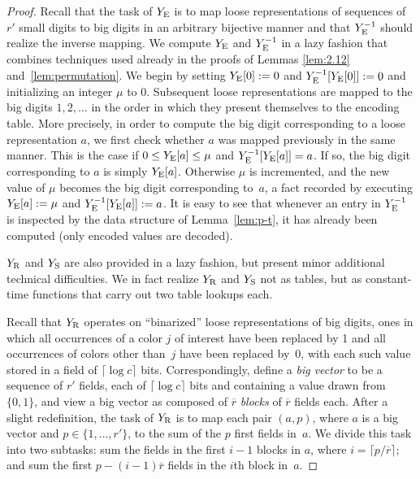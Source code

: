 \documentclass[envcountsame,envcountsect,undated,nolinenumbers]{lnthi}
\def\Tceil#1{\lceil #1\rceil}
\def\rbar{\overline{r}}
\begin{document}
\begin{proof}
Recall that
the task of $Y_{\mbox{\scriptsize E}}$ is to
map loose representations of sequences of
$r'$ small digits to big digits in an arbitrary
bijective manner and that $Y^{-1}_{\mbox{\scriptsize E}}$
should realize the inverse mapping.
We compute $Y_{\mbox{\scriptsize E}}$ and $Y^{-1}_{\mbox{\scriptsize E}}$
in a lazy fashion that combines techniques
used already in the proofs of
Lemmas \ref{lem:2.12} and~\ref{lem:permutation}.
We begin by setting $Y_{\mbox{\scriptsize E}}[0]:=0$
and $Y^{-1}_{\mbox{\scriptsize E}}[Y_{\mbox{\scriptsize E}}[0]]:=0$ and initializing
an integer $\mu$ to 0.
Subsequent loose representations are mapped to
the big digits $1,2,\ldots$ in the order in which
they present themselves to the encoding table.
More precisely, in order to compute
the big digit corresponding
to a loose representation $a$, we first check
whether $a$ was mapped previously in the same manner.
This is the case if $0\le Y_{\mbox{\scriptsize E}}[a]\le\mu$
and $Y^{-1}_{\mbox{\scriptsize E}}[Y_{\mbox{\scriptsize E}}[a]]=a$.
If so, the big digit corresponding to $a$
is simply $Y_{\mbox{\scriptsize E}}[a]$.
Otherwise $\mu$ is incremented, and the new
value of $\mu$ becomes the big digit corresponding
to~$a$, a fact recorded by executing
$Y_{\mbox{\scriptsize E}}[a]:=\mu$ and
$Y^{-1}_{\mbox{\scriptsize E}}[Y_{\mbox{\scriptsize E}}[a]]:=a$.
It is easy to see that whenever an entry in
$Y^{-1}_{\mbox{\scriptsize E}}$ is inspected by the data
structure of Lemma~\ref{lem:p-t}, it
has already been computed
(only encoded values are decoded).

$Y_{\mbox{\scriptsize R}}$ and $Y_{\mbox{\scriptsize S}}$ are also
provided in a lazy fashion, but present minor
additional technical difficulties.
We in fact realize $Y_{\mbox{\scriptsize R}}$ and $Y_{\mbox{\scriptsize S}}$
not as tables, but as constant-time functions
that carry out two table lookups each.

Recall that $Y_{\mbox{\scriptsize R}}$ operates on ``binarized'' loose
representations of big digits, ones in which
all occurrences of a color $j$ of interest have been
replaced by 1 and all occurrences of colors other than~$j$
have been replaced by~0, with each such value stored
in a field of $\Tceil{\log c}$ bits.
Correspondingly, define a \emph{big vector} to be
a sequence of $r'$ fields, each of $\Tceil{\log c}$
bits and containing a value drawn from $\{0,1\}$,
and view a big vector as composed of $\rbar$
\emph{blocks} of $\rbar$ fields each.
After a slight redefinition, the task of $Y_{\mbox{\scriptsize R}}$
is to map each pair $(a,p)$, where $a$ is a big
vector and $p\in\{1,\ldots,r'\}$, to the
sum of the $p$ first fields in~$a$.
We divide this task into two subtasks:
sum the fields in the first $i-1$ blocks in $a$,
where $i=\Tceil{{p/{\rbar}}}$;
and sum the first $p-(i-1)\rbar$
fields in the $i$th block in~$a$.


\end{proof}
\end{document}
